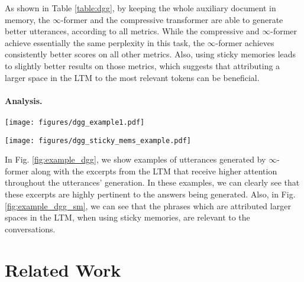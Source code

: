 \documentclass[11pt]{article}
\begin{document}
As shown in Table \ref{table:dgg}, by keeping the whole auxiliary document in memory, the \mbox{$\infty$-former} and the compressive transformer are able to generate better utterances, according to all metrics. 
While the compressive and \mbox{$\infty$-former} achieve essentially the same perplexity in this task, 
the \mbox{$\infty$-former} achieves consistently better scores on all other metrics. 
Also, using sticky memories leads to slightly better results on those metrics, which suggests that attributing a larger space in the LTM to the most relevant tokens can be beneficial.


\paragraph{Analysis. } 
\begin{figure*}[t]
  \centering
    \texttt{[image: figures/dgg\_example1.pdf]}
  \caption{Examples of answers generated by \mbox{$\infty$-former} on a dialogue about the movie ``Home Alone''. The excerpts from the LTM that are more attended to throughout the utterances generation are highlighted on each color, correspondingly.}
  \label{fig:example_dgg}
\end{figure*}
\begin{figure*}[t]
  \centering
    \texttt{[image: figures/dgg\_sticky\_mems\_example.pdf]}
  \caption{Phrases that hold larger spaces of the LTM, when using sticky memories, for two dialogue examples (in App. \ref{sec:examples}).}
  \label{fig:example_dgg_sm}
\end{figure*}
In Fig. \ref{fig:example_dgg}, we show examples of utterances generated by \mbox{$\infty$-former} along with the excerpts from the LTM that receive higher attention throughout the utterances' generation. In these examples, we can clearly see that these excerpts are highly pertinent to the answers being generated. Also, in Fig. \ref{fig:example_dgg_sm}, we can see that the phrases which are attributed larger spaces in the LTM, when using sticky memories, are relevant to the conversations. 


\section{Related Work}
\end{document}
